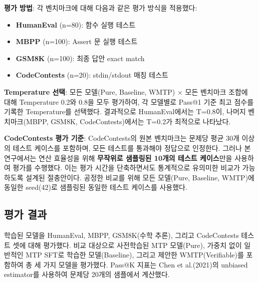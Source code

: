 \documentclass[11pt,a4paper]{article}
\begin{document}
\textbf{평가 방법}: 각 벤치마크에 대해 다음과 같은 평가 방식을 적용했다:
\begin{itemize}
    \item \textbf{HumanEval} (n=80): 함수 실행 테스트
    \item \textbf{MBPP} (n=100): Assert 문 실행 테스트
    \item \textbf{GSM8K} (n=100): 최종 답안 exact match
    \item \textbf{CodeContests} (n=20): stdin/stdout 매칭 테스트
\end{itemize}

\textbf{Temperature 선택}: 모든 모델(Pure, Baseline, WMTP) × 모든 벤치마크 조합에 대해 Temperature 0.2와 0.8을 모두 평가하여, 각 모델별로 Pass@1 기준 최고 점수를 기록한 Temperature를 선택했다. 결과적으로 HumanEval에서는 T=0.8이, 나머지 벤치마크(MBPP, GSM8K, CodeContests)에서는 T=0.2가 최적으로 나타났다.

\textbf{CodeContests 평가 기준}: CodeContests의 원본 벤치마크는 문제당 평균 30개 이상의 테스트 케이스를 포함하며, 모든 테스트를 통과해야 정답으로 인정한다. 그러나 본 연구에서는 연산 효율성을 위해 \textbf{무작위로 샘플링된 10개의 테스트 케이스}만을 사용하여 평가를 수행했다. 이는 평가 시간을 단축하면서도 통계적으로 유의미한 비교가 가능하도록 설계된 절충안이다. 공정한 비교를 위해 모든 모델(Pure, Baseline, WMTP)에 동일한 seed(42)로 샘플링된 동일한 테스트 케이스를 사용했다.

\subsection{평가 결과}

학습된 모델을 HumanEval, MBPP, GSM8K(수학 추론), 그리고 CodeContests 테스트 셋에 대해 평가했다. 비교 대상으로 사전학습된 MTP 모델(Pure), 가중치 없이 일반적인 MTP SFT로 학습한 모델(Baseline), 그리고 제안한 WMTP(Verifiable)를 포함하여 총 세 가지 모델을 평가했다. Pass@K 지표는 Chen et al.(2021)의 unbiased estimator를 사용하여 문제당 20개의 샘플에서 계산했다.
\end{document}
